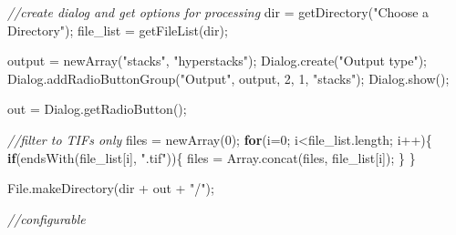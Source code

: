 \documentclass[
  12pt,
  a4paper,
]{book}
\newenvironment{Shaded}{}{}
\newcommand{\CommentTok}[1]{\textcolor[rgb]{0.38,0.63,0.69}{\textit{#1}}}
\newcommand{\ControlFlowTok}[1]{\textcolor[rgb]{0.00,0.44,0.13}{\textbf{#1}}}
\newcommand{\DecValTok}[1]{\textcolor[rgb]{0.25,0.63,0.44}{#1}}
\newcommand{\NormalTok}[1]{#1}
\newcommand{\OperatorTok}[1]{\textcolor[rgb]{0.40,0.40,0.40}{#1}}
\newcommand{\StringTok}[1]{\textcolor[rgb]{0.25,0.44,0.63}{#1}}
\begin{document}
\begin{Shaded}
\begin{Highlighting}[]
\CommentTok{//create dialog and get options for processing}
\NormalTok{dir }\OperatorTok{=}\NormalTok{ getDirectory}\OperatorTok{(}\StringTok{"Choose a Directory"}\OperatorTok{);}
\NormalTok{file\_list }\OperatorTok{=}\NormalTok{ getFileList}\OperatorTok{(}\NormalTok{dir}\OperatorTok{);}

\NormalTok{output }\OperatorTok{=}\NormalTok{ newArray}\OperatorTok{(}\StringTok{"stacks"}\OperatorTok{,} \StringTok{"hyperstacks"}\OperatorTok{);}
\NormalTok{Dialog}\OperatorTok{.}\NormalTok{create}\OperatorTok{(}\StringTok{"Output type"}\OperatorTok{);}
\NormalTok{Dialog}\OperatorTok{.}\NormalTok{addRadioButtonGroup}\OperatorTok{(}\StringTok{"Output"}\OperatorTok{,}\NormalTok{ output}\OperatorTok{,} \DecValTok{2}\OperatorTok{,} \DecValTok{1}\OperatorTok{,} \StringTok{"stacks"}\OperatorTok{);}
\NormalTok{Dialog}\OperatorTok{.}\NormalTok{show}\OperatorTok{();}

\NormalTok{out }\OperatorTok{=}\NormalTok{ Dialog}\OperatorTok{.}\NormalTok{getRadioButton}\OperatorTok{();}

\CommentTok{//filter to TIFs only}
\NormalTok{files }\OperatorTok{=}\NormalTok{ newArray}\OperatorTok{(}\DecValTok{0}\OperatorTok{);}
\ControlFlowTok{for}\OperatorTok{(}\NormalTok{i}\OperatorTok{=}\DecValTok{0}\OperatorTok{;}\NormalTok{ i}\OperatorTok{\textless{}}\NormalTok{file\_list}\OperatorTok{.}\NormalTok{length}\OperatorTok{;}\NormalTok{ i}\OperatorTok{++)\{}
    \ControlFlowTok{if}\OperatorTok{(}\NormalTok{endsWith}\OperatorTok{(}\NormalTok{file\_list}\OperatorTok{[}\NormalTok{i}\OperatorTok{],} \StringTok{".tif"}\OperatorTok{))\{}
\NormalTok{        files }\OperatorTok{=}\NormalTok{ Array}\OperatorTok{.}\NormalTok{concat}\OperatorTok{(}\NormalTok{files}\OperatorTok{,}\NormalTok{ file\_list}\OperatorTok{[}\NormalTok{i}\OperatorTok{]);}
    \OperatorTok{\}}
\OperatorTok{\}}

\NormalTok{File}\OperatorTok{.}\NormalTok{makeDirectory}\OperatorTok{(}\NormalTok{dir }\OperatorTok{+}\NormalTok{ out }\OperatorTok{+} \StringTok{"/"}\OperatorTok{);}

\CommentTok{//configurable}


\end{Highlighting}
\end{Shaded}
\end{document}
